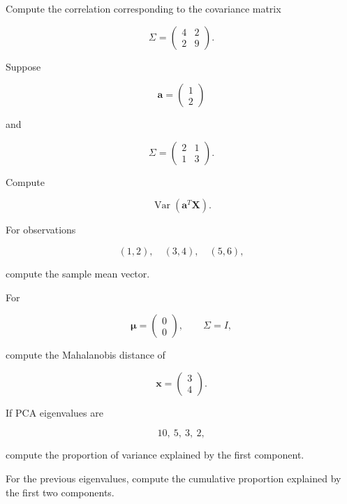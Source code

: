 \begin{exercise}[2]
Compute the correlation corresponding to the covariance matrix

\[
\Sigma
=
\begin{pmatrix}
4&2\\
2&9
\end{pmatrix}.
\]
\end{exercise}

\begin{exercise}[2]
Suppose

\[
\mathbf{a}
=
\begin{pmatrix}
1\\
2
\end{pmatrix}
\]

and

\[
\Sigma
=
\begin{pmatrix}
2&1\\
1&3
\end{pmatrix}.
\]

Compute

\[
\operatorname{Var}
(
\mathbf{a}^T\mathbf{X}
).
\]
\end{exercise}

\begin{exercise}[2]
For observations

\[
(1,2),
\quad
(3,4),
\quad
(5,6),
\]

compute the sample mean vector.
\end{exercise}

\begin{exercise}[2]
For

\[
\boldsymbol{\mu}
=
\begin{pmatrix}
0\\
0
\end{pmatrix},
\qquad
\Sigma=I,
\]

compute the Mahalanobis distance of

\[
\mathbf{x}
=
\begin{pmatrix}
3\\
4
\end{pmatrix}.
\]
\end{exercise}

\begin{exercise}[2]
If PCA eigenvalues are

\[
10,\ 5,\ 3,\ 2,
\]

compute the proportion of variance explained by the first component.
\end{exercise}

\begin{exercise}[2]
For the previous eigenvalues, compute the cumulative proportion explained
by the first two components.
\end{exercise}

